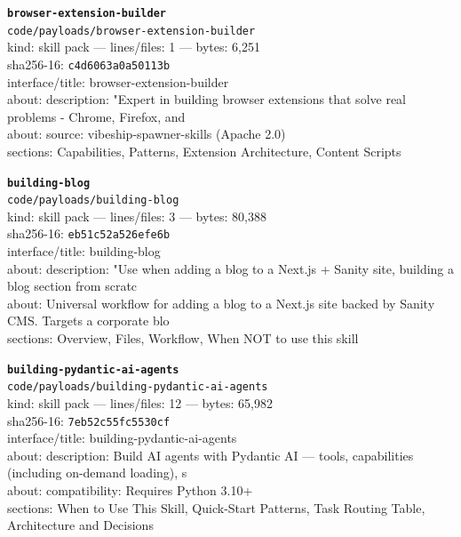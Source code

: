 \noindent\textbf{\texttt{browser-extension-builder}}\\
\texttt{code/payloads/browser-extension-builder}\\
kind: skill pack --- lines/files: 1 --- bytes: 6,251\\
sha256-16: \texttt{c4d6063a0a50113b}\\
interface/title: browser-extension-builder\\
about: description: "Expert in building browser extensions that solve real problems - Chrome, Firefox, and \\
about: source: vibeship-spawner-skills (Apache 2.0)\\
sections: Capabilities, Patterns, Extension Architecture, Content Scripts\\
\vspace*{6.0pt}
\newpage

\noindent\textbf{\texttt{building-blog}}\\
\texttt{code/payloads/building-blog}\\
kind: skill pack --- lines/files: 3 --- bytes: 80,388\\
sha256-16: \texttt{eb51c52a526efe6b}\\
interface/title: building-blog\\
about: description: "Use when adding a blog to a Next.js + Sanity site, building a blog section from scratc\\
about: Universal workflow for adding a blog to a Next.js site backed by Sanity CMS. Targets a corporate blo\\
sections: Overview, Files, Workflow, When NOT to use this skill\\
\vspace*{6.0pt}

\noindent\textbf{\texttt{building-pydantic-ai-agents}}\\
\texttt{code/payloads/building-pydantic-ai-agents}\\
kind: skill pack --- lines/files: 12 --- bytes: 65,982\\
sha256-16: \texttt{7eb52c55fc5530cf}\\
interface/title: building-pydantic-ai-agents\\
about: description: Build AI agents with Pydantic AI — tools, capabilities (including on-demand loading), s\\
about: compatibility: Requires Python 3.10+\\
sections: When to Use This Skill, Quick-Start Patterns, Task Routing Table, Architecture and Decisions\\
\vspace*{6.0pt}

